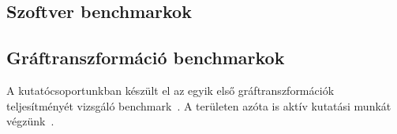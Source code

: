 \subsection{Szoftver benchmarkok}





\subsection{Gráftranszformáció benchmarkok}

A kutatócsoportunkban készült el az egyik első gráftranszformációk teljesítményét vizsgáló benchmark~\cite{vlhcc05_vsv}. A területen azóta is aktív kutatási munkát végzünk~\cite{DBLP:conf/staf/SzarnyasSRV15}.

